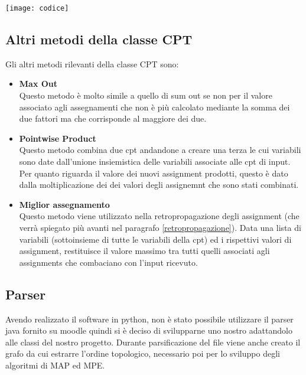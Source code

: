 \begin{minipage}{\linewidth}
	\centering
	\texttt{[image: codice]}
	\label{codice} 
\end{minipage}
 

\subsection{Altri metodi della classe CPT}
Gli altri metodi rilevanti della classe CPT sono:

\begin{itemize}
\item \textbf{Max Out}\\ 
Questo metodo è molto simile a quello di sum out se non per il valore associato agli assegnamenti che non è più calcolato mediante la somma dei due fattori ma che corrisponde al maggiore dei due.

\item \textbf{Pointwise Product}\\ 
Questo metodo combina due cpt andandone a creare una terza le cui variabili sono date dall’unione insiemistica delle variabili associate alle cpt di input. Per quanto riguarda il valore dei nuovi assignment prodotti, questo è dato dalla moltiplicazione dei dei valori degli assignemnt che sono stati combinati.

\item \textbf{Miglior assegnamento}\\
Questo metodo viene utilizzato nella retropropagazione degli assignment (che verrà spiegato più avanti nel paragrafo \ref{retropropagazione}). Data una lista di variabili (sottoinsieme di tutte le variabili della cpt) ed i rispettivi valori di assignment, restituisce il valore massimo tra tutti quelli associati agli assignments che combaciano con l'input ricevuto.
\end{itemize}
 
\subsection{Parser}
Avendo realizzato il software in python, non è stato possibile utilizzare il parser java fornito su moodle quindi si è deciso di svilupparne uno nostro adattandolo alle classi del nostro progetto. Durante parsificazione del file viene anche creato il grafo da cui estrarre l’ordine topologico, necessario poi per lo sviluppo degli algoritmi di MAP ed MPE.

